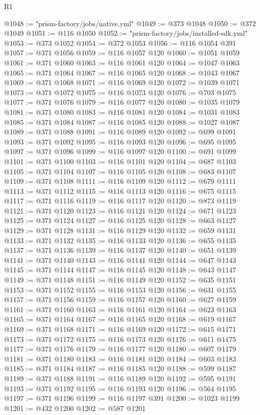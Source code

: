 \begin{lexlean}{R1}
\begin{coremodule}
@1048 := "prism-factory/jobs/native.yml"
@1049 := @373 @1048
@1050 := @372 @1049
@1051 := @116 @1050
@1052 := "prism-factory/jobs/installed-sdk.yml"
@1053 := @373 @1052
@1054 := @372 @1053
@1056 := @116 @1054 @391
@1057 := @371 @1056
@1059 := @116 @1057 @120
@1060 := @1051 @1059
@1061 := @371 @1060
@1063 := @116 @1061 @120
@1064 := @1047 @1063
@1065 := @371 @1064
@1067 := @116 @1065 @120
@1068 := @1043 @1067
@1069 := @371 @1068
@1071 := @116 @1069 @120
@1072 := @1039 @1071
@1073 := @371 @1072
@1075 := @116 @1073 @120
@1076 := @703 @1075
@1077 := @371 @1076
@1079 := @116 @1077 @120
@1080 := @1035 @1079
@1081 := @371 @1080
@1083 := @116 @1081 @120
@1084 := @1031 @1083
@1085 := @371 @1084
@1087 := @116 @1085 @120
@1088 := @1027 @1087
@1089 := @371 @1088
@1091 := @116 @1089 @120
@1092 := @699 @1091
@1093 := @371 @1092
@1095 := @116 @1093 @120
@1096 := @695 @1095
@1097 := @371 @1096
@1099 := @116 @1097 @120
@1100 := @691 @1099
@1101 := @371 @1100
@1103 := @116 @1101 @120
@1104 := @687 @1103
@1105 := @371 @1104
@1107 := @116 @1105 @120
@1108 := @683 @1107
@1109 := @371 @1108
@1111 := @116 @1109 @120
@1112 := @679 @1111
@1113 := @371 @1112
@1115 := @116 @1113 @120
@1116 := @675 @1115
@1117 := @371 @1116
@1119 := @116 @1117 @120
@1120 := @873 @1119
@1121 := @371 @1120
@1123 := @116 @1121 @120
@1124 := @671 @1123
@1125 := @371 @1124
@1127 := @116 @1125 @120
@1128 := @663 @1127
@1129 := @371 @1128
@1131 := @116 @1129 @120
@1132 := @659 @1131
@1133 := @371 @1132
@1135 := @116 @1133 @120
@1136 := @655 @1135
@1137 := @371 @1136
@1139 := @116 @1137 @120
@1140 := @651 @1139
@1141 := @371 @1140
@1143 := @116 @1141 @120
@1144 := @647 @1143
@1145 := @371 @1144
@1147 := @116 @1145 @120
@1148 := @643 @1147
@1149 := @371 @1148
@1151 := @116 @1149 @120
@1152 := @635 @1151
@1153 := @371 @1152
@1155 := @116 @1153 @120
@1156 := @631 @1155
@1157 := @371 @1156
@1159 := @116 @1157 @120
@1160 := @627 @1159
@1161 := @371 @1160
@1163 := @116 @1161 @120
@1164 := @623 @1163
@1165 := @371 @1164
@1167 := @116 @1165 @120
@1168 := @619 @1167
@1169 := @371 @1168
@1171 := @116 @1169 @120
@1172 := @615 @1171
@1173 := @371 @1172
@1175 := @116 @1173 @120
@1176 := @611 @1175
@1177 := @371 @1176
@1179 := @116 @1177 @120
@1180 := @607 @1179
@1181 := @371 @1180
@1183 := @116 @1181 @120
@1184 := @603 @1183
@1185 := @371 @1184
@1187 := @116 @1185 @120
@1188 := @599 @1187
@1189 := @371 @1188
@1191 := @116 @1189 @120
@1192 := @595 @1191
@1193 := @371 @1192
@1195 := @116 @1193 @120
@1196 := @564 @1195
@1197 := @371 @1196
@1199 := @116 @1197 @391
@1200 := @1023 @1199
@1201 := @432 @1200
@1202 := @587 @1201

\end{coremodule}
\end{lexlean}
